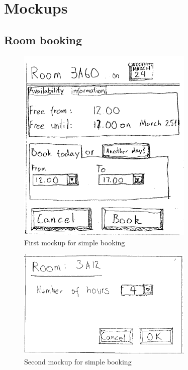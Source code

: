 \clearpage
\pagebreak

\section{Mockups} 
\label{app:mockups}

\subsection{Room booking}

\begin{figure}[htb]
\begin{center}
\leavevmode
\includegraphics[width=0.75\textwidth]{images/bookRoomMockup}
\end{center}
\caption{First mockup for simple booking}
\label{fig:app1_mock1_1}
\end{figure}

\begin{figure}[htb]
\begin{center}
\leavevmode
\includegraphics[width=0.75\textwidth]{images/bookRoomMockup2}
\end{center}
\caption{Second mockup for simple booking}
\label{fig:app1_mock1_2}
\end{figure}

